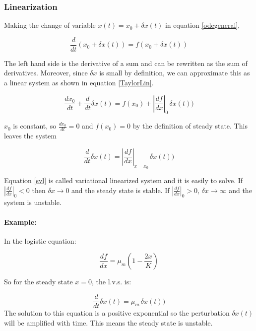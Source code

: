 \documentclass[12pt]{article}
\begin{document}
\subsubsection{Linearization}

Making the change of variable $x(t) = x_0 + \delta x(t)$ in equation \ref{odegeneral},

\begin{equation}
	\frac{d}{dt} \left( x_0 + \delta x(t) \right) = f(x_0 + \delta x(t)) \nonumber
\end{equation}

The left hand side is the  derivative of a sum and can be rewritten as the sum of derivatives. Moreover, since $\delta x$ is small by definition, we can approximate this as a linear system as shown in equation \ref{TaylorLin}.

\begin{equation}
	 \frac{dx_0}{dt} + \frac{d}{dt}\delta x(t)  = f(x_0) +\left|\frac{df}{dx}\right|_0 \, \delta x(t)) \nonumber
\end{equation}

$x_0$ is constant, so $\frac{dx_0}{dt}=0$ and $f(x_0)=0$ by the definition of steady state. This leaves the system 

\begin{equation}
	\label{svl}
	\frac{d}{dt}\delta x(t)  =  \left|\frac{df}{dx}\right|_{x=x_0} \,  \delta x(t)) 
\end{equation}

Equation \ref{svl} is called variational linearized system and it is easily to solve. If $\left|\frac{df}{dx}\right|_0 < 0$ then $\delta x \rightarrow 0$ and the steady state is stable. If $\left|\frac{df}{dx}\right|_0 > 0$, $\delta x \rightarrow \infty$ and the system is unstable.

\paragraph{Example:} In the logistic equation:

\begin{equation}
\frac{df}{dx} = \mu_{m} \left( 1-\frac{2 x}{K}\right) \nonumber
\end{equation}

 So for the steady state $x=0$, the l.v.s. is:
 
 \begin{equation}
 	\frac{d}{dt}\delta x(t)  = \mu_m \,  \delta x(t))  \nonumber
 \end{equation}
The solution to this equation is a positive exponential so the perturbation $\delta x(t)$ will be amplified with time. This means the steady state is unstable.
\end{document}
